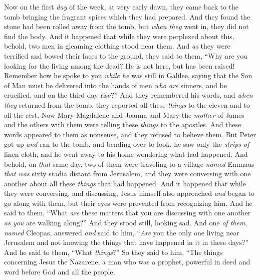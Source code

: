\begin{biblechapter} %
 Now on the first \textit{day} of the week, at very early dawn, they came back to the tomb bringing the fragrant spices which they had prepared.
\verse And they found the stone had been rolled away from the tomb,
\verse but \textit{when they} went in, they did not find the body.
\verse And it happened that while they were perplexed about this, behold, two men in gleaming clothing stood near them.
\verse And \textit{as} they were terrified and bowed their faces to the ground, they said to them, “Why are you looking for the living among the dead?
\verse He is not here, but has been raised! Remember how he spoke to you \textit{while he} was still in Galilee,
\verse saying that the Son of Man must be delivered into the hands of men \textit{who are} sinners, and be crucified, and on the third day rise?”
\verse And they remembered his words,
\verse and \textit{when they} returned from the tomb, they reported all these \textit{things} to the eleven and to all the rest.
\verse Now Mary Magdalene and Joanna and Mary the \textit{mother} of James and the others with them were telling these \textit{things} to the apostles.
\verse And these words appeared to them as nonsense, and they refused to believe them.
\verse But Peter got up \textit{and} ran to the tomb, and bending over to look, he saw only the \textit{strips of} linen cloth, and he went away to his home wondering what had happened.
 And behold, on \textit{that} same day, two of them were traveling to a village \textit{named} Emmaus \textit{that was} sixty stadia distant from Jerusalem,
\verse and they were conversing with one another about all these \textit{things} that had happened.
\verse And it happened that while they were conversing, and discussing, Jesus himself also approached \textit{and} began to go along with them,
\verse but their eyes were prevented from recognizing him.
\verse And he said to them, “What \textit{are} these matters that you are discussing with one another \textit{as you} are walking along?” And they stood still, looking sad.
\verse And one \textit{of them}, \textit{named} Cleopas, answered \textit{and} said to him, “\textit{Are} you the only one living near Jerusalem and not knowing the things that have happened in it in these days?”
\verse And he said to them, “What \textit{things}?” So they said to him, “The things concerning Jesus the Nazarene, a man who was a prophet, powerful in deed and word before God and all the people,

\end{biblechapter}
